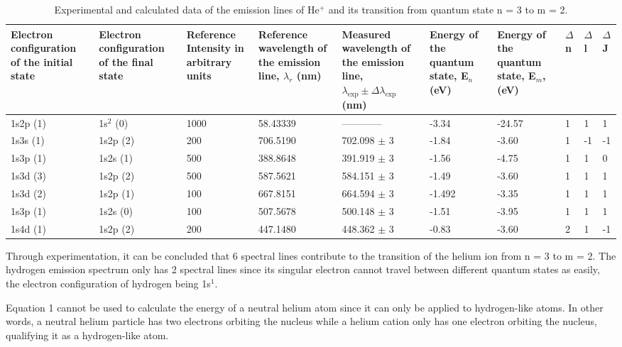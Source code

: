 \documentclass[10pt, letterpaper, twoside]{article}
\begin{document}
\begin{table}[!ht]
    \centering
        \begin{tabular}{|p{1.5cm}|p{1.5cm}|p{1.5cm}|p{1.5cm}|p{1.8cm}|p{1.5cm}|p{1.5cm}|p{0.5cm}|p{0.5cm}|p{0.5cm}|}
        \hline
        Electron configuration of the initial state & Electron configuration of the final state & Reference Intensity in arbitrary units & Reference wavelength of the emission line, $\lambda_r$ (nm) & Measured wavelength of the emission line, $\lambda_{\text{exp}} \pm \Delta\lambda_{\text{exp}}$ (nm) & Energy of the quantum state, E$_n$ (eV) & Energy of the quantum state, E$_m$, (eV) & $\Delta$n & $\Delta$l & $\Delta$J\\
        \hline
        1s2p (1) & 1s$^2$ (0) & 1000 & 58.43339 & ------------ & -3.34 & -24.57 & 1 & 1 & 1\\
        \hline
        1s3s (1) & 1s2p (2) & 200 & 706.5190 & 702.098 $\pm$ 3 & -1.84 & -3.60 & 1 & -1 & -1 \\
        \hline
        1s3p (1) & 1s2s (1) & 500 & 388.8648 & 391.919 $\pm$ 3& -1.56 & -4.75 & 1 & 1 & 0\\
        \hline
        1s3d (3) & 1s2p (2) & 500 & 587.5621 & 584.151 $\pm$ 3& -1.49 & -3.60 & 1 & 1 & 1\\
        \hline
        1s3d (2) & 1s2p (1) & 100 & 667.8151 & 664.594 $\pm$ 3& -1.492 & -3.35 & 1 & 1 & 1\\
        \hline
        1s3p (1) & 1s2s (0) & 100 & 507.5678 & 500.148 $\pm$ 3 & -1.51 & -3.95 & 1 & 1 & 1\\
        \hline
        1s4d (1) & 1s2p (2) & 200 & 447.1480 & 448.362 $\pm$ 3 & -0.83 & -3.60 & 2 & 1 & -1\\
        \hline
    \end{tabular}
    \caption{Experimental and calculated data of the emission lines of He$^+$ and its transition from quantum state n = 3 to m = 2.}
    \label{tab:my_label}
\end{table}
    
Through experimentation, it can be concluded that 6 spectral lines contribute to the transition of the helium ion from n = 3 to m = 2. The hydrogen emission spectrum only has 2 spectral lines since its singular electron cannot travel between different quantum states as easily, the electron configuration of hydrogen being 1s$^1$.

Equation 1 cannot be used to calculate the energy of a neutral helium atom since it can only be applied to hydrogen-like atoms. In other words, a neutral helium particle has two electrons orbiting the nucleus while a helium cation only has one electron orbiting the nucleus, qualifying it as a hydrogen-like atom.
\vspace{-1em}
\end{document}
